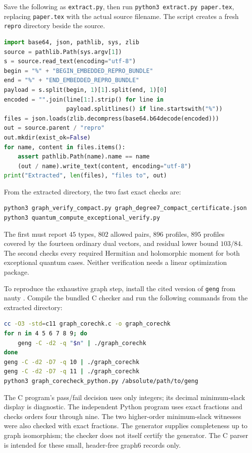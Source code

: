 \documentclass[11pt,a4paper]{article}
\theoremstyle{definition}\newtheorem{definition}[theorem]{Definition}
\theoremstyle{remark}\newtheorem{remark}[theorem]{Remark}
\begin{document}
Save the following as \texttt{extract.py}, then run
\texttt{python3 extract.py paper.tex}, replacing \texttt{paper.tex}
with the actual source filename. The script creates a fresh
\texttt{repro} directory beside the source.
\begin{lstlisting}[language=Python]
import base64, json, pathlib, sys, zlib
source = pathlib.Path(sys.argv[1])
s = source.read_text(encoding="utf-8")
begin = "%" + "BEGIN_EMBEDDED_REPRO_BUNDLE"
end = "%" + "END_EMBEDDED_REPRO_BUNDLE"
payload = s.split(begin, 1)[1].split(end, 1)[0]
encoded = "".join(line[1:].strip() for line in
                  payload.splitlines() if line.startswith("%"))
files = json.loads(zlib.decompress(base64.b64decode(encoded)))
out = source.parent / "repro"
out.mkdir(exist_ok=False)
for name, content in files.items():
    assert pathlib.Path(name).name == name
    (out / name).write_text(content, encoding="utf-8")
print("Extracted", len(files), "files to", out)
\end{lstlisting}

From the extracted directory, the two fast exact checks are:
\begin{lstlisting}[language=bash]
python3 graph_verify_compact.py graph_degree7_compact_certificate.json
python3 quantum_compute_exceptional_verify.py
\end{lstlisting}
The first must report $45$ types, $802$ allowed pairs, $896$ profiles,
$895$ profiles covered by the fourteen ordinary dual vectors, and
residual lower bound $103/84$. The second checks every required
Hermitian and holomorphic moment for both exceptional quantum cases.
Neither verification needs a linear optimization package.

To reproduce the exhaustive graph step, install the cited version of
\texttt{geng} from nauty \cite{Nauty}. Compile the bundled C checker
and run the following commands from the extracted directory:
\begin{lstlisting}[language=bash]
cc -O3 -std=c11 graph_corechk.c -o graph_corechk
for n in 4 5 6 7 8 9; do
    geng -C -d2 -q "$n" | ./graph_corechk
done
geng -C -d2 -D7 -q 10 | ./graph_corechk
geng -C -d2 -D7 -q 11 | ./graph_corechk
python3 graph_corecheck_python.py /absolute/path/to/geng
\end{lstlisting}
The C program's pass/fail decision uses only integers; its decimal
minimum-slack display is diagnostic. The independent Python program
uses exact fractions and checks orders four through nine. The two
higher-order minimum-slack witnesses were also checked with exact
fractions. The generator supplies completeness up to graph isomorphism;
the checker does not itself certify the generator. The C parser is
intended for these small, header-free graph6 records only.
\end{document}
